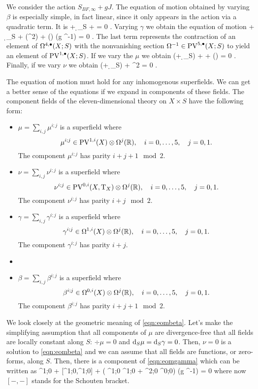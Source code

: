 We consider the action $S_{BF, \infty} + gJ$.
The equation of motion obtained by varying $\beta$ is especially simple, in fact linear, since it only appears in the action via a quadratic term. 
It is
\beqn\label{eqn:eombeta}
\dbar \nu + \d_S \nu + \div \mu = 0 .
\eeqn
Varying $\gamma$ we obtain the equation of motion
\beqn\label{eqn:eomgamma}
\dbar \mu + \d_S \mu +   \div (\mu^2) +  (\del \gamma \wedge \del \gamma) \vee (g \Omega^{-1}) = 0 .
\eeqn
The last term represents the contraction of an element of $\Omega^{4,\bullet}(X;S)$ with the nonvanishing section $\Omega^{-1} \in {\rm PV}^{5,\bullet}(X;S)$ to yield an element of ${\rm PV}^{1,\bullet}(X;S)$. 
If we vary the $\mu$ we obtain 
\beqn\label{eqn:eommu}
(\dbar + \d_S) \gamma + \del \beta +  (\mu \vee \del \gamma) = 0 .
\eeqn
Finally, if we vary $\nu$ we obtain
\beqn\label{eqn:eomnu}
(\dbar + \d_S) \beta +   \mu^2 \vee \del \gamma = 0 .
\eeqn

The equation of motion must hold for any inhomogenous superfields.
We can get a better sense of the equations if we expand in components of these fields. 
The component fields of the eleven-dimensional theory on $X \times S$ have the following form: 
\begin{itemize}
\item $\mu = \sum_{i,j} \mu^{i;j}$ is a superfield where
\[
\mu^{i;j} \in {\rm PV}^{1,i}(X) \otimes \Omega^j(\mathbb R) ,\quad i=0,\ldots, 5, \quad j=0,1.
\]
The component $\mu^{i;j}$ has parity $i+j+1 \mod 2$. 
\item $\nu = \sum_{i,j} \nu^{i;j}$ is a superfield where
\[
\nu^{i;j} \in {\rm PV}^{0,i}(X, {\rm T}_X) \otimes \Omega^j(\mathbb R) ,\quad i=0,\ldots, 5, \quad j=0,1.
\]
The component $\nu^{i;j}$ has parity $i+j \mod 2$. 
\item 
$\gamma = \sum_{i,j} \gamma^{i;j}$ is a superfield where
\[
\gamma^{i;j} \in \Omega^{1,i}(X) \otimes \Omega^j(\mathbb R) ,\quad i=0,\ldots, 5, \quad j=0,1.
\]
The component $\gamma^{i;j}$ has parity $i+j$. 
\item 
\item $\beta = \sum_{i,j} \beta^{i;j}$ is a superfield where
\[
\beta^{i;j} \in \Omega^{0,i}(X) \otimes \Omega^j(\mathbb R) ,\quad i=0,\ldots, 5, \quad j=0,1.
\]
The component $\beta^{i;j}$ has parity $i+j+1 \mod 2$. 
\end{itemize}

We look closely at the geometric meaning of \eqref{eqn:eombeta}. 
Let's make the simplifying assumption that all components of $\mu$ are divergence-free that all fields are locally constant along $S$: $\div \mu = 0$ and ${\rm d}_S \mu = {\rm d}_S \gamma = 0$.
Then, $\nu = 0$ is a solution to \eqref{eqn:eombeta} and we can assume that all fields are functions, or zero-forms, along $S$. 
Then, there is a component of \eqref{eqn:eomgamma} which can be written as 
\beqn\label{eqn:eomgamma1}
\dbar \mu^{1;0} +  [\mu^{1;0},\mu^{1;0}] + \left( \del \gamma^{1;0} \wedge \del \gamma^{1;0} + \del \gamma^{2;0} \wedge \del \gamma^{0;0}\right) \vee (g \Omega^{-1}) = 0 
\eeqn
where now $[-,-]$ stands for the Schouten bracket.

